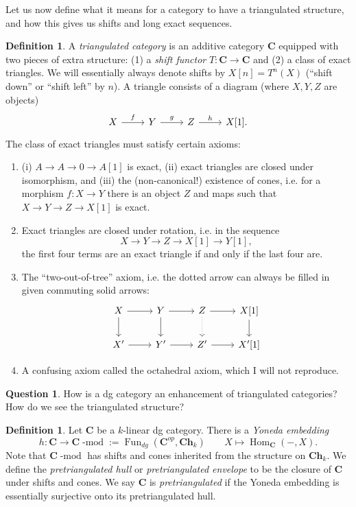 \documentclass[10pt]{article}
\theoremstyle{definition}
\newtheorem{defn}[thm]{Definition}
\newtheorem{question}[thm]{Question}
\DeclareMathOperator{\Hom}{Hom}
\DeclareMathOperator{\dmod}{-mod}
\DeclareMathOperator{\Fun}{Fun}
\newcommand{\cat}{\mathbf}
\begin{document}
Let us now define what it means for a category to have a triangulated structure, and how this gives us shifts and long exact sequences.
\begin{defn}
A \emph{triangulated category} is an additive category $\cat{C}$ equipped with two pieces of extra structure: (1) a \emph{shift functor} $T: \cat{C} \rightarrow \cat{C}$ and (2) a class of exact triangles.  We will essentially always denote shifts by $X[n] = T^n(X)$ (``shift down'' or ``shift left'' by $n$).  A triangle consists of a diagram (where $X,Y,Z$ are objects)
$$\begin{tikzcd}
X \arrow[r, "f"] & Y \arrow[r, "g"] & Z \arrow[r, "h"] & X[1].
\end{tikzcd}$$
The class of exact triangles must satisfy certain axioms:
\begin{enumerate}
\item[(TR1)] (i) $A \rightarrow A \rightarrow 0 \rightarrow A[1]$ is exact, (ii) exact triangles are closed under isomorphism, and (iii) the (non-canonical!) existence of cones, i.e. for a morphism $f: X \rightarrow Y$ there is an object $Z$ and maps such that $X \rightarrow Y \rightarrow Z \rightarrow X[1]$ is exact.
\item[(TR2)] Exact triangles are closed under rotation, i.e. in the sequence 
$$X \rightarrow Y \rightarrow Z \rightarrow X[1] \rightarrow Y[1],$$
the first four terms are an exact triangle if and only if the last four are.
\item[(TR3)] The ``two-out-of-tree'' axiom, i.e. the dotted arrow can always be filled in given commuting solid arrows:
$$\begin{tikzcd}
X \arrow[r] \arrow[d] & Y \arrow[r] \arrow[d] & Z \arrow[r] \arrow[d, dotted] & X[1] \arrow[d] \\
X' \arrow[r] & Y' \arrow[r] & Z' \arrow[r] & X'[1]
\end{tikzcd}$$
\item[(TR4)] A confusing axiom called the octahedral axiom, which I will not reproduce.
\end{enumerate}
\end{defn}



\begin{question}
How is a dg category an enhancement of triangulated categories?  How do we see the triangulated structure?
\end{question}

\begin{defn}
Let $\cat{C}$ be a $k$-linear dg category.  There is a \emph{Yoneda embedding} $$h: \cat{C} \rightarrow \cat{C}\dmod := \Fun_{dg}(\cat{C}^{op}, \cat{Ch}_k) \;\;\;\;\;\;\; X \mapsto \Hom_{\cat{C}}(-, X).$$
Note that $\cat{C}\dmod$ has shifts and cones inherited from the structure on $\cat{Ch}_k$.  We define the \emph{pretriangulated hull} or \emph{pretriangulated envelope} to be the closure of $\cat{C}$ under shifts and cones.  We say $\cat{C}$ is \emph{pretriangulated} if the Yoneda embedding is essentially surjective onto its pretriangulated hull.
\end{defn}
\end{document}
